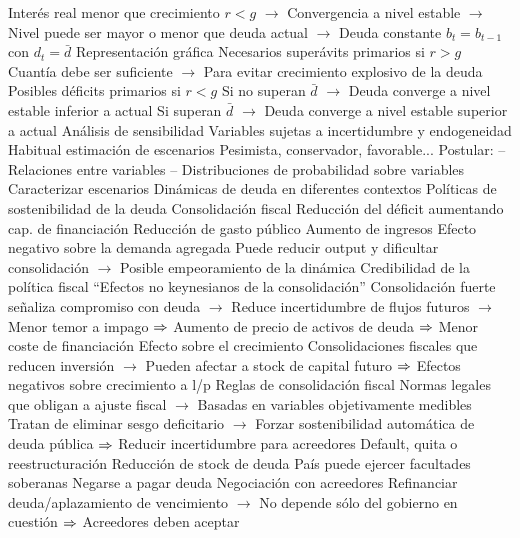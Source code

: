 \documentclass{nuevotema}
\begin{document}
\begin{esquemal}
				\4[] \grafica{rgtg}
				\4[] Interés real menor que crecimiento $r<g$
				\4[] $\to$ Convergencia a nivel estable
				\4[] $\to$ Nivel puede ser mayor o menor que deuda actual
				\4[] $\to$ Deuda constante $b_t=b_{t-1}$ con $d_t = \bar{d}$
				\4[] Representación gráfica
				\4[] 
				\4[$\then$] Necesarios superávits primarios si $r > g$
				\4[] Cuantía debe ser suficiente
				\4[] $\to$ Para evitar crecimiento explosivo de la deuda
				\4[$\then$] Posibles déficits primarios si $r<g$
				\4[] Si no superan $\bar{d}$
				\4[] $\to$ Deuda converge a nivel estable inferior a actual
				\4[] Si superan $\bar{d}$
				\4[] $\to$ Deuda converge a nivel estable superior a actual
			\3 Análisis de sensibilidad
				\4 Variables sujetas a incertidumbre y endogeneidad
				\4 Habitual estimación de escenarios
				\4[] Pesimista, conservador, favorable...
				\4 Postular:
				\4[] -- Relaciones entre variables
				\4[] -- Distribuciones de probabilidad sobre variables
				\4 Caracterizar escenarios
				\4[] Dinámicas de deuda en diferentes contextos
		\2 Políticas de sostenibilidad de la deuda
			\3 Consolidación fiscal
				\4 Reducción del déficit aumentando cap. de financiación
				\4[] Reducción de gasto público
				\4[] Aumento de ingresos
				\4 Efecto negativo sobre la demanda agregada
				\4[] Puede reducir output y dificultar consolidación
				\4[] $\to$ Posible empeoramiento de la dinámica
				\4 Credibilidad de la política fiscal
				\4[] ``Efectos no keynesianos de la consolidación''
				\4[] Consolidación fuerte señaliza compromiso con deuda
				\4[] $\to$ Reduce incertidumbre de flujos futuros
				\4[] $\to$ Menor temor a impago
				\4[] $\then$ Aumento de precio de activos de deuda
				\4[] $\then$ Menor coste de financiación
				\4 Efecto sobre el crecimiento
				\4[] Consolidaciones fiscales que reducen inversión
				\4[] $\to$ Pueden afectar a stock de capital futuro
				\4[] $\then$ Efectos negativos sobre crecimiento a l/p
				\4 Reglas de consolidación fiscal
				\4[] Normas legales que obligan a ajuste fiscal
				\4[] $\to$ Basadas en variables objetivamente medibles
				\4[] Tratan de eliminar sesgo deficitario
				\4[] $\to$ Forzar sostenibilidad automática de deuda pública
				\4[] $\then$ Reducir incertidumbre para acreedores
			\3 Default, quita o reestructuración
				\4 Reducción de stock de deuda
				\4 País puede ejercer facultades soberanas
				\4[] Negarse a pagar deuda
				\4 Negociación con acreedores
				\4[] Refinanciar deuda/aplazamiento de vencimiento
				\4[] $\to$ No depende sólo del gobierno en cuestión
				\4[] $\then$ Acreedores deben aceptar

\end{esquemal}
\end{document}
